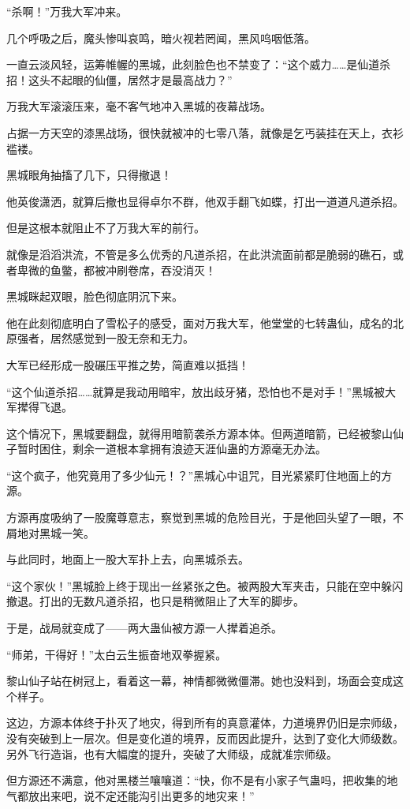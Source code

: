 \begin{this_body}
“杀啊！”万我大军冲来。

几个呼吸之后，魔头惨叫哀鸣，暗火视若罔闻，黑风呜咽低落。

一直云淡风轻，运筹帷幄的黑城，此刻脸色也不禁变了：“这个威力……是仙道杀招！这头不起眼的仙僵，居然才是最高战力？”

万我大军滚滚压来，毫不客气地冲入黑城的夜幕战场。

占据一方天空的漆黑战场，很快就被冲的七零八落，就像是乞丐装挂在天上，衣衫褴褛。

黑城眼角抽搐了几下，只得撤退！

他英俊潇洒，就算后撤也显得卓尔不群，他双手翻飞如蝶，打出一道道凡道杀招。

但是这根本就阻止不了万我大军的前行。

就像是滔滔洪流，不管是多么优秀的凡道杀招，在此洪流面前都是脆弱的礁石，或者卑微的鱼鳖，都被冲刷卷席，吞没消灭！

黑城眯起双眼，脸色彻底阴沉下来。

他在此刻彻底明白了雪松子的感受，面对万我大军，他堂堂的七转蛊仙，成名的北原强者，居然感觉到一股无奈和无力。

大军已经形成一股碾压平推之势，简直难以抵挡！

“这个仙道杀招……就算是我动用暗牢，放出歧牙猪，恐怕也不是对手！”黑城被大军撵得飞退。

这个情况下，黑城要翻盘，就得用暗箭袭杀方源本体。但两道暗箭，已经被黎山仙子暂时困住，剩余一道根本拿拥有浪迹天涯仙蛊的方源毫无办法。

“这个疯子，他究竟用了多少仙元！？”黑城心中诅咒，目光紧紧盯住地面上的方源。

方源再度吸纳了一股魔尊意志，察觉到黑城的危险目光，于是他回头望了一眼，不屑地对黑城一笑。

与此同时，地面上一股大军扑上去，向黑城杀去。

“这个家伙！”黑城脸上终于现出一丝紧张之色。被两股大军夹击，只能在空中躲闪撤退。打出的无数凡道杀招，也只是稍微阻止了大军的脚步。

于是，战局就变成了——两大蛊仙被方源一人撵着追杀。

“师弟，干得好！”太白云生振奋地双拳握紧。

黎山仙子站在树冠上，看着这一幕，神情都微微僵滞。她也没料到，场面会变成这个样子。

这边，方源本体终于扑灭了地灾，得到所有的真意灌体，力道境界仍旧是宗师级，没有突破到上一层次。但是变化道的境界，反而因此提升，达到了变化大师级数。另外飞行造诣，也有大幅度的提升，突破了大师级，成就准宗师级。

但方源还不满意，他对黑楼兰嚷嚷道：“快，你不是有小家子气蛊吗，把收集的地气都放出来吧，说不定还能沟引出更多的地灾来！”


\end{this_body}
